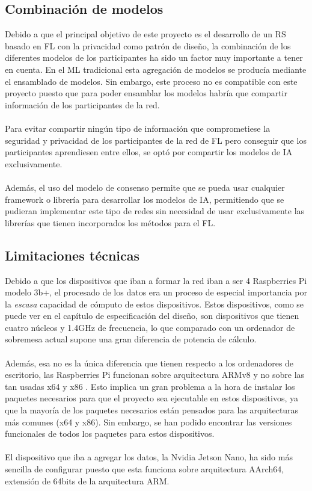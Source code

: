 \subsection{Combinación de modelos}
Debido a que el principal objetivo de este proyecto es el desarrollo de un RS basado en FL con la privacidad como patrón de diseño, la combinación de los diferentes modelos de los participantes ha sido un factor muy importante a tener en cuenta. En el ML tradicional esta agregación de modelos se producía mediante el ensamblado de modelos. Sin embargo, este proceso no es compatible con este proyecto puesto que para poder ensamblar los modelos habría que compartir información de los participantes de la red.
\\ \\
Para evitar compartir ningún tipo de información que comprometiese la seguridad y privacidad de los participantes de la red de FL pero conseguir que los participantes aprendiesen entre ellos, se optó por compartir los modelos de IA exclusivamente.
\\\\
Además, el uso del modelo de consenso permite que se pueda usar cualquier framework o librería para desarrollar los modelos de IA, permitiendo que se pudieran implementar este tipo de redes sin necesidad de usar exclusivamente las librerías que tienen incorporados los métodos para el FL.

\subsection{Limitaciones técnicas}
Debido a que los dispositivos que iban a formar la red iban a ser 4 Raspberries Pi modelo 3b+, el procesado de los datos era un proceso de especial importancia por la \textit{escasa} capacidad de cómputo de estos dispositivos. Estos dispositivos, como se puede ver en el capítulo de especificación del diseño, son dispositivos que tienen cuatro núcleos y 1.4GHz de frecuencia, lo que comparado con un ordenador de sobremesa actual supone una gran diferencia de potencia de cálculo.
\\ \\
Además, esa no es la única diferencia que tienen respecto a los ordenadores de escritorio, las Raspberries Pi funcionan sobre arquitectura ARMv8 y no sobre las tan usadas x64 y x86 . Esto implica un gran problema a la hora de instalar los paquetes necesarios para que el proyecto sea ejecutable en estos dispositivos, ya que la mayoría de los paquetes necesarios están pensados para las arquitecturas más comunes (x64 y x86). Sin embargo, se han podido encontrar las versiones funcionales de todos los paquetes para estos dispositivos.
\\ \\
El dispositivo que iba a agregar los datos, la Nvidia Jetson Nano, ha sido más sencilla de configurar puesto que esta funciona sobre arquitectura AArch64, extensión de 64bits de la arquitectura ARM.
